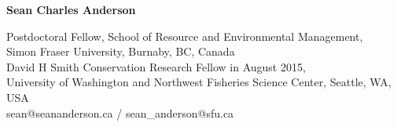 \documentclass[11pt]{article}
\title{}
\author{}
\date{}
\begin{document}
\begin{spacing}{1}
\thispagestyle{empty}

{\LARGE \textbf{Sean Charles Anderson}}\\
\vspace{0.8mm}

Postdoctoral Fellow, School of Resource and Environmental Management,\\ Simon Fraser University, Burnaby, BC, Canada\\
David H Smith Conservation Research Fellow in August 2015,\\
University of Washington and Northwest Fisheries Science Center, Seattle, WA,
USA\\
sean@seananderson.ca / sean\_anderson@sfu.ca\\

\vspace{-2.1mm}



\end{spacing}
\end{document}
